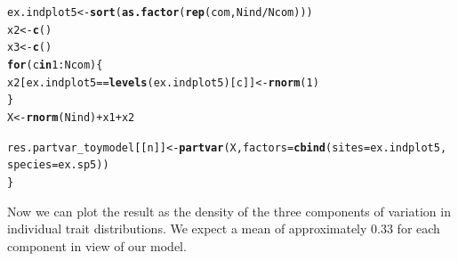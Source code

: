 \documentclass[12pt]{article}\usepackage[]{graphicx}\usepackage[]{color}
\makeatletter
\newcommand{\hlnum}[1]{\textcolor[rgb]{0.686,0.059,0.569}{#1}}%
\newcommand{\hlopt}[1]{\textcolor[rgb]{0,0,0}{#1}}%
\newcommand{\hlstd}[1]{\textcolor[rgb]{0.345,0.345,0.345}{#1}}%
\newcommand{\hlkwa}[1]{\textcolor[rgb]{0.161,0.373,0.58}{\textbf{#1}}}%
\newcommand{\hlkwb}[1]{\textcolor[rgb]{0.69,0.353,0.396}{#1}}%
\newcommand{\hlkwc}[1]{\textcolor[rgb]{0.333,0.667,0.333}{#1}}%
\newcommand{\hlkwd}[1]{\textcolor[rgb]{0.737,0.353,0.396}{\textbf{#1}}}%
\newenvironment{kframe}{%
 \def\at@end@of@kframe{}%
 \ifinner\ifhmode%
  \def\at@end@of@kframe{\end{minipage}}%
  \begin{minipage}{\columnwidth}%
 \fi\fi%
 \def\FrameCommand##1{\hskip\@totalleftmargin \hskip-\fboxsep
 \colorbox{shadecolor}{##1}\hskip-\fboxsep
     \hskip-\linewidth \hskip-\@totalleftmargin \hskip\columnwidth}%
 \MakeFramed {\advance\hsize-\width
   \@totalleftmargin\z@ \linewidth\hsize
   \@setminipage}}%
 {\par\unskip\endMakeFramed%
 \at@end@of@kframe}
\newenvironment{knitrout}{}{} %
\makeatother
\begin{document}
\begin{knitrout}
\begin{kframe}
\begin{alltt}
 \hlstd{ex.indplot5} \hlkwb{<-} \hlkwd{sort}\hlstd{(}\hlkwd{as.factor}\hlstd{(}\hlkwd{rep}\hlstd{(com, Nind}\hlopt{/}\hlstd{Ncom)))}
 \hlstd{x2} \hlkwb{<-} \hlkwd{c}\hlstd{()}
 \hlstd{x3} \hlkwb{<-} \hlkwd{c}\hlstd{()}
 \hlkwa{for}\hlstd{(c} \hlkwa{in} \hlnum{1}\hlopt{:}\hlstd{Ncom)\{}
 \hlstd{x2[ex.indplot5} \hlopt{==} \hlkwd{levels}\hlstd{(ex.indplot5 )[c]]} \hlkwb{<-} \hlkwd{rnorm}\hlstd{(}\hlnum{1}\hlstd{)}
 \hlstd{\}}
 \hlstd{X} \hlkwb{<-} \hlkwd{rnorm}\hlstd{(Nind)} \hlopt{+} \hlstd{x1} \hlopt{+} \hlstd{x2}

 \hlstd{res.partvar_toymodel[[n]]} \hlkwb{<-} \hlkwd{partvar}\hlstd{(X,} \hlkwc{factors} \hlstd{=} \hlkwd{cbind}\hlstd{(}\hlkwc{sites} \hlstd{= ex.indplot5,}
               \hlkwc{species} \hlstd{= ex.sp5))}
\hlstd{\}}
\end{alltt}
\end{kframe}
\end{knitrout}

Now we can plot the result as the density of the three components of variation in individual trait distributions. 
We expect a mean of approximately 0.33 for each component in view of our model.
\end{document}
